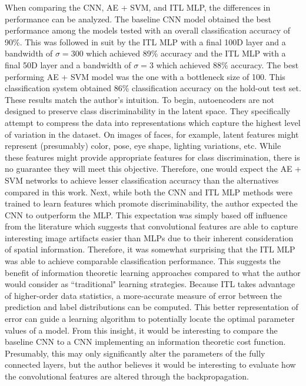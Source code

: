 \documentclass[conference]{IEEEtran}
\begin{document}
When comparing the CNN, AE + SVM, and ITL MLP, the differences in performance can be analyzed.  The baseline CNN model obtained the best performance among the models tested with an overall classification accuracy of 90\%.  This was followed in suit by the ITL MLP with a final 100D layer and a bandwidth of $\sigma=300$ which achieved 89\% accuracy and the ITL MLP with a final 50D layer and a bandwidth of $\sigma=3$ which achieved 88\% accuracy.  The best performing AE + SVM model was the one with a bottleneck size of 100.  This classification system obtained 86\% classification accuracy on the hold-out test set.  These results match the author's intuition.  To begin, autoencoders are not designed to preserve class discriminability in the latent space.  They specifically attempt to compress the data into  representations which capture the highest level of variation in the dataset.  On images of faces, for example, latent features might represent (presumably) color, pose, eye shape, lighting variations, etc.  While these features might provide appropriate features for class discrimination, there is no guarantee they will meet this objective.  Therefore, one would expect the AE + SVM networks to achieve lesser classification accuracy than the alternatives compared in this work.  Next, while both the CNN and ITL MLP methods were trained to  learn features which promote discriminability, the author expected the CNN to outperform the MLP.  This expectation was simply based off influence from the literature which suggests that convolutional features are able to capture interesting image artifacts easier than MLPs due to their inherent consideration of spatial information.  Therefore, it was somewhat surprising that the ITL MLP was able to achieve comparable classification performance.  This suggests the benefit of information theoretic learning approaches compared to what the author would consider as ``traditional" learning strategies.  Because ITL takes advantage of higher-order data statistics, a more-accurate measure of error between the  prediction and label distributions can be computed.  This better representation of error can guide a learning algorithm to potentially locate  the optimal  parameter values of a model.  From this insight, it would be interesting to compare the baseline CNN to a CNN implementing an information theoretic cost function.  Presumably, this may only significantly alter  the parameters of the fully connected layers, but the author believes it would be interesting to evaluate how the convolutional features are altered through the backpropagation.
\end{document}
